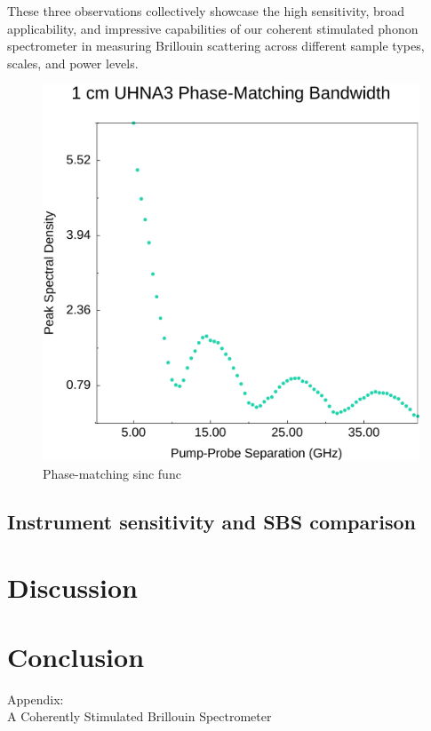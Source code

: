 \documentclass[%
  reprint,
  superscriptaddress,
  amsmath,amssymb,
  aps,
  prapplied,
]{revtex4-2}
\begin{document}
These three observations collectively showcase the high sensitivity, broad applicability, and impressive capabilities of our coherent stimulated phonon spectrometer in measuring Brillouin scattering across different sample types, scales, and power levels.

\begin{figure}[t]
\centering
\includegraphics[width=.45\textwidth]{Phase-Match.pdf}
\caption{Phase-matching sinc func}\label{fig:Phase-Match}
\end{figure}


\subsection*{Instrument sensitivity and SBS comparison}

\lipsum[1-3]


\section{Discussion}\label{Discussion}

\lipsum[1-2]


\section{Conclusion}\label{Conclusion}

\lipsum[1]


\begin{acknowledgments}

\end{acknowledgments}

\clearpage %
\onecolumngrid %

\begin{titlepage}
\centering
{}
{\Large Appendix:\\[10pt] A Coherently Stimulated Brillouin Spectrometer\par}
\end{titlepage}
\end{document}
